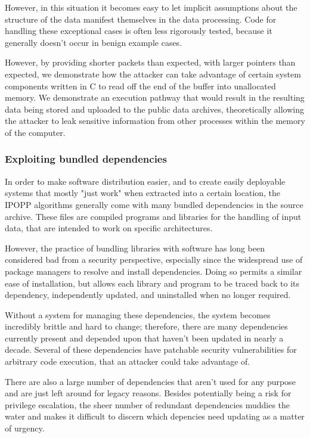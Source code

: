 However, in this situation it becomes easy to let implicit assumptions about the structure of the data manifest themselves in the data processing.
Code for handling these exceptional cases is often less rigorously tested, because it generally doesn't occur in benign example cases.

However, by providing shorter packets than expected, with larger pointers than expected, we demonstrate how the attacker can take advantage of certain system components written in C to read off the end of the buffer into unallocated memory.
We demonstrate an execution pathway that would result in the resulting data being stored and uploaded to the public data archives, theoretically allowing the attacker to leak sensitive information from other processes within the memory of the computer.


\subsubsection{Exploiting bundled dependencies}

In order to make software distribution easier, and to create easily deployable systems that mostly "just work" when extracted into a certain location, the IPOPP algorithms generally come with many bundled dependencies in the source archive.
These files are compiled programs and libraries for the handling of input data, that are intended to work on specific architectures.

However, the practice of bundling libraries with software has long been considered bad from a security perspective, especially since the widespread use of package managers to resolve and install dependencies.
Doing so permits a similar ease of installation, but allows each library and program to be traced back to its dependency, independently updated, and uninstalled when no longer required.

Without a system for managing these dependencies, the system becomes incredibly brittle and hard to change; therefore, there are many dependencies currently present and depended upon that haven't been updated in nearly a decade.
Several of these dependencies have patchable security vulnerabilities for arbitrary code execution, that an attacker could take advantage of.

There are also a large number of dependencies that aren't used for any purpose and are just left around for legacy reasons.
Besides potentially being a risk for privilege escalation, the sheer number of redundant dependencies muddies the water and makes it difficult to discern which depencies need updating as a matter of urgency.

